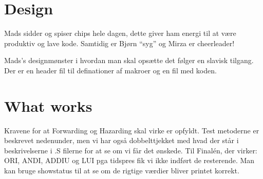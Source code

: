 \documentclass[11pt,a4paper]{report}
\theoremstyle{plain}
\theoremstyle{definition}
\theoremstyle{remark}
\numberwithin{equation}{section}
\begin{document}

\clearpage\maketitle
\thispagestyle{empty}

\clearpage\newpage
\thispagestyle{plain}
\section*{Design}
Mads sidder og spiser chips hele dagen, dette giver ham energi til at være produktiv og lave kode.
Samtidig er Bjørn ``syg'' og Mirza er cheerleader!

Mads's designmønster i hvordan man skal opsætte det følger en slavisk tilgang.
Der er en header fil til definationer af makroer og en fil med koden.
\section*{What works}
Kravene for at Forwarding og Hazarding skal virke er opfyldt. Test metoderne er beskrevet nedenunder, men vi har også dobbelttjekket med hvad der står i beskrivelserne i .S filerne for at se om vi får det ønskede. Til Finalén, der virker: ORI, ANDI, ADDIU og LUI pga tidspres fik vi ikke indført de resterende.
Man kan bruge showstatus til at se om de rigtige værdier bliver printet korrekt.
\end{document}
